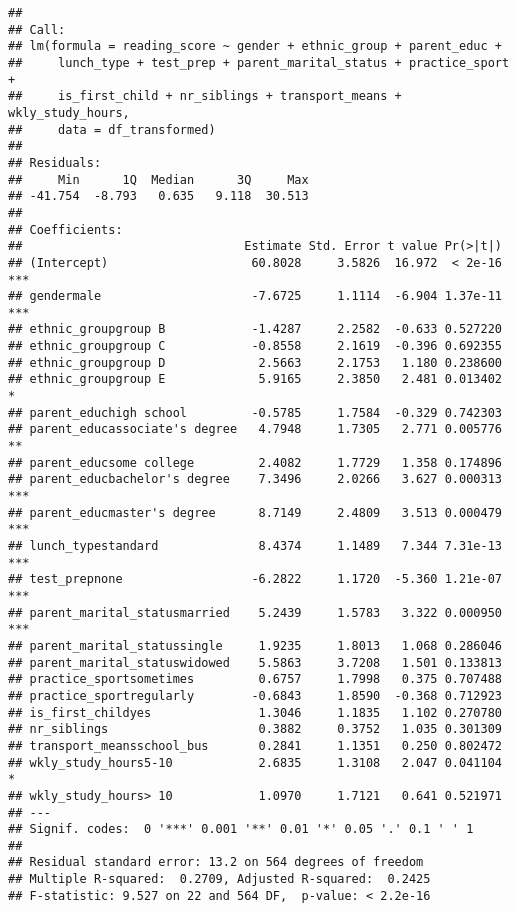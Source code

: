 \documentclass[
  12pt,
]{article}
\begin{document}
\begin{verbatim}
## 
## Call:
## lm(formula = reading_score ~ gender + ethnic_group + parent_educ + 
##     lunch_type + test_prep + parent_marital_status + practice_sport + 
##     is_first_child + nr_siblings + transport_means + wkly_study_hours, 
##     data = df_transformed)
## 
## Residuals:
##     Min      1Q  Median      3Q     Max 
## -41.754  -8.793   0.635   9.118  30.513 
## 
## Coefficients:
##                               Estimate Std. Error t value Pr(>|t|)    
## (Intercept)                    60.8028     3.5826  16.972  < 2e-16 ***
## gendermale                     -7.6725     1.1114  -6.904 1.37e-11 ***
## ethnic_groupgroup B            -1.4287     2.2582  -0.633 0.527220    
## ethnic_groupgroup C            -0.8558     2.1619  -0.396 0.692355    
## ethnic_groupgroup D             2.5663     2.1753   1.180 0.238600    
## ethnic_groupgroup E             5.9165     2.3850   2.481 0.013402 *  
## parent_educhigh school         -0.5785     1.7584  -0.329 0.742303    
## parent_educassociate's degree   4.7948     1.7305   2.771 0.005776 ** 
## parent_educsome college         2.4082     1.7729   1.358 0.174896    
## parent_educbachelor's degree    7.3496     2.0266   3.627 0.000313 ***
## parent_educmaster's degree      8.7149     2.4809   3.513 0.000479 ***
## lunch_typestandard              8.4374     1.1489   7.344 7.31e-13 ***
## test_prepnone                  -6.2822     1.1720  -5.360 1.21e-07 ***
## parent_marital_statusmarried    5.2439     1.5783   3.322 0.000950 ***
## parent_marital_statussingle     1.9235     1.8013   1.068 0.286046    
## parent_marital_statuswidowed    5.5863     3.7208   1.501 0.133813    
## practice_sportsometimes         0.6757     1.7998   0.375 0.707488    
## practice_sportregularly        -0.6843     1.8590  -0.368 0.712923    
## is_first_childyes               1.3046     1.1835   1.102 0.270780    
## nr_siblings                     0.3882     0.3752   1.035 0.301309    
## transport_meansschool_bus       0.2841     1.1351   0.250 0.802472    
## wkly_study_hours5-10            2.6835     1.3108   2.047 0.041104 *  
## wkly_study_hours> 10            1.0970     1.7121   0.641 0.521971    
## ---
## Signif. codes:  0 '***' 0.001 '**' 0.01 '*' 0.05 '.' 0.1 ' ' 1
## 
## Residual standard error: 13.2 on 564 degrees of freedom
## Multiple R-squared:  0.2709, Adjusted R-squared:  0.2425 
## F-statistic: 9.527 on 22 and 564 DF,  p-value: < 2.2e-16
\end{verbatim}
\end{document}
